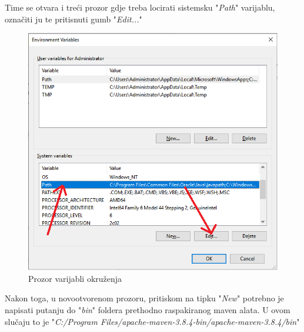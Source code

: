 			Time se otvara i treći prozor gdje treba locirati sistemsku "\textit{Path}" varijablu, označiti ju te pritisnuti gumb "\textit{Edit...}"
			
			\begin{figure}[H]
			\centering
			\includegraphics[width=\textwidth, scale=0.5]{slike/EnvironmentVariables}
			\caption{Prozor varijabli okruženja}
			\label{fig:EnvironmentVariables}
			\end{figure}
			
			Nakon toga, u novootvorenom prozoru, pritiskom na tipku "\textit{New}" potrebno je napisati putanju do "\textit{bin}" foldera prethodno raspakiranog maven alata. U ovom slučaju to je "\textit{C:/Program Files/apache-maven-3.8.4-bin/apache-maven-3.8.4/bin}"
			
